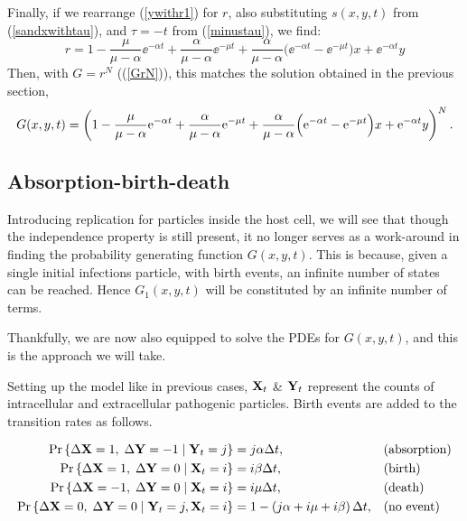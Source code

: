 \vspace{15pt}
\noindent
Finally, if we rearrange (\ref{ywithr1}) for $r$, also substituting $s(x,y,t)$ from (\ref{sandxwithtau}), and $\tau = -t$ from (\ref{minustau}), we find:
\begin{equation*}
r = 1-\frac{\mu}{\mu - \alpha}  \ee^{-\alpha t}  + \frac{\alpha}{\mu - \alpha} \ee^{-\mu t}  + \frac{\alpha}{\mu - \alpha} \Big(   \ee^{-\alpha t} - \ee^{-\mu t} \Big)x +  \ee^{-\alpha t} y
\end{equation*}
Then, with $G = r^N$ ((\ref{GrN})), this matches the solution obtained in the previous section, 
\begin{equation*}
G(x,y,t) = \left(1-\frac{\mu}{\mu - \alpha}  {\rm e}^{-\alpha t}  + \frac{\alpha}{\mu - \alpha} {\rm e}^{-\mu t}  + \frac{\alpha}{\mu - \alpha} \Big(   {\rm e}^{-\alpha t} - {\rm e}^{-\mu t} \Big)x +  {\rm e}^{-\alpha t} y\right)^N.
\end{equation*}





\subsection{Absorption-birth-death}

Introducing replication for particles inside the host cell, we will see that though the independence property is still present, it no longer serves as a work-around in finding the probability generating function $G(x,y,t)$. This is because, given a single initial infections particle, with birth events, an infinite number of states can be reached. Hence $G_1(x,y,t)$ will be constituted by an infinite number of terms.\par

Thankfully, we are now also equipped to solve the PDEs for $G(x,y,t)$, and this is the approach we will take.\par

Setting up the model like in previous cases, ${{\bf X}_t}$ \& ${{\bf Y}_t}$ represent the counts of intracellular and extracellular pathogenic particles. Birth events are added to the transition rates as follows.

\begin{align*}
     {\text{Pr}\left\{\Delta{\bf X}= 1,\;\Delta{\bf Y}= -1 \;|\; {{\bf Y}_t}= j\right\}} &= j \alpha \Delta t,  &&\text{(absorption)}\\
     {\text{Pr}\left\{\Delta{\bf X}= 1,\;\Delta{\bf Y} = 0 \;|\; {{\bf X}_t} = i\right\}} &= i \beta \Delta t,  &&\text{(birth)}\\
      {\text{Pr}\left\{\Delta{\bf X}= -1,\;\Delta{\bf Y} = 0 \;|\; {{\bf X}_t} = i\right\}} &= i \mu \Delta t,  &&\text{(death)}\\
     {\text{Pr}\left\{\Delta{\bf X}= 0,\;\Delta{\bf Y} = 0 \;|\; {{\bf Y}_t} = j, {{\bf X}_t}=i\right\}} &= 1 -  \left( j\alpha + i\mu + i\beta\right)\Delta t,  &&\text{(no event)}
\label{probSpec1}
\end{align*} 

